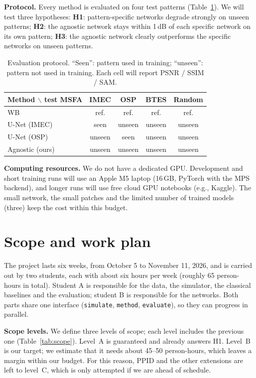 \documentclass{article}
\begin{document}
\textbf{Protocol.} Every method is evaluated on four test patterns
(Table~\ref{tab:protocol}). We will test three hypotheses:
\textbf{H1}: pattern-specific networks degrade strongly on unseen patterns;
\textbf{H2}: the agnostic network stays within 1\,dB of each specific network
on its own pattern; \textbf{H3}: the agnostic network clearly outperforms the
specific networks on unseen patterns.

\begin{table}[htb]
\centering
\caption{Evaluation protocol. ``Seen'': pattern used in training; ``unseen'':
pattern not used in training. Each cell will report PSNR / SSIM / SAM.}
\label{tab:protocol}
\footnotesize
\begin{tabular}{|l|c|c|c|c|}
\hline
Method $\backslash$ test MSFA & IMEC & OSP & BTES & Random \\
\hline
WB                & ref.   & ref.   & ref.   & ref.   \\
U-Net (IMEC)      & seen   & unseen & unseen & unseen \\
U-Net (OSP)       & unseen & seen   & unseen & unseen \\
Agnostic (ours)   & unseen & unseen & unseen & unseen \\
\hline
\end{tabular}
\end{table}

\textbf{Computing resources.} We do not have a dedicated GPU. Development and
short training runs will use an Apple M5 laptop (16\,GB, PyTorch with the MPS
backend), and longer runs will use free cloud GPU notebooks (e.g., Kaggle).
The small network, the small patches and the limited number of trained models
(three) keep the cost within this budget.

\section{Scope and work plan}
\label{sec:plan}

The project lasts six weeks, from October 5 to November 11, 2026, and is
carried out by two students, each with about six hours per week (roughly 65
person-hours in total). Student A is responsible for the data, the
simulator, the classical baselines and the evaluation; student B is
responsible for the networks. Both parts share one interface
(\texttt{simulate}, \texttt{method}, \texttt{evaluate}), so they can progress
in parallel.

\textbf{Scope levels.} We define three levels of scope; each level includes
the previous one (Table~\ref{tab:scope}). Level~A is guaranteed and already
answers H1. Level~B is our target; we estimate that it needs about 45--50
person-hours, which leaves a margin within our budget. For this reason, PPID
and the other extensions are left to level~C, which is only attempted if we
are ahead of schedule.
\end{document}
